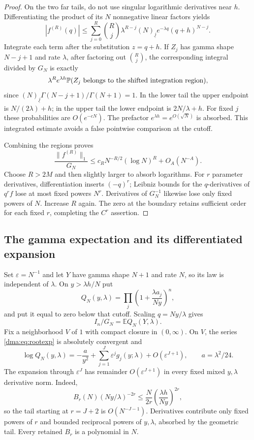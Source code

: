 \documentclass[11pt,letterpaper]{article}
\theoremstyle{remark}\newtheorem{remark}[theorem]{Remark}
\newcommand{\E}{\mathbb E}
\newcommand{\Prob}{\mathbb P}
\newcommand{\fall}[2]{(#1)_{\underline{#2}}}
\begin{document}
\begin{proof}
On the two far tails, do not use singular logarithmic derivatives near $h$. Differentiating the product of its $N$ nonnegative linear factors yields
\begin{equation}\label{dma:eq:leibniz}
 |f^{(R)}(q)|\leq\sum_{j=0}^R\binom Rj\lambda^{R-j}
 \fall Nj e^{-\lambda q}(q+h)^{N-j}.
\end{equation}
Integrate each term after the substitution $z=q+h$. If $Z_j$ has gamma shape $N-j+1$ and rate $\lambda$, after factoring out $\binom Rj$, the corresponding integral divided by $G_N$ is exactly
\begin{equation}\label{dma:eq:tailintegrated}
 \lambda^R e^{\lambda h}\Prob(Z_j\hbox{ belongs to the shifted integration region}),
\end{equation}
since $\fall Nj\Gamma(N-j+1)/\Gamma(N+1)=1$. In the lower tail the upper endpoint is $N/(2\lambda)+h$; in the upper tail the lower endpoint is $2N/\lambda+h$. For fixed $j$ these probabilities are $O(e^{-cN})$. The prefactor $e^{\lambda h}=e^{O(\sqrt N)}$ is absorbed. This integrated estimate avoids a false pointwise comparison at the cutoff.

Combining the regions proves
\[
 \frac{\|f^{(R)}\|_1}{G_N}
 \leq c_R N^{-R/2}(\log N)^R+O_A(N^{-A}).
\]
Choose $R>2M$ and then slightly larger to absorb logarithms. For $r$ parameter derivatives, differentiation inserts $(-q)^r$; Leibniz bounds for the $q$-derivatives of $q^rf$ lose at most fixed powers $N^r$. Derivatives of $G_N^{-1}$ likewise lose only fixed powers of $N$. Increase $R$ again. The zero at the boundary retains sufficient order for each fixed $r$, completing the $C^r$ assertion.
\end{proof}

\subsection{The gamma expectation and its differentiated expansion}
Set $\varepsilon=N^{-1}$ and let $Y$ have gamma shape $N+1$ and rate $N$, so its law is independent of $\lambda$. On $y>\lambda h/N$ put
\[
 Q_N(y,\lambda)=\prod_j\left(1+\frac{\lambda a_j}{Ny}\right)^n,
\]
and put it equal to zero below that cutoff. Scaling $q=Ny/\lambda$ gives
\begin{equation}\label{dma:eq:expect}
 I_n/G_N=\E Q_N(Y,\lambda).
\end{equation}
Fix a neighborhood $V$ of $1$ with compact closure in $(0,\infty)$. On $V$, the series \eqref{dma:eq:rootexp} is absolutely convergent and
\begin{equation}\label{dma:eq:g}
 \log Q_N(y,\lambda)=-\frac a{y^2}+\sum_{j=1}^J\varepsilon^j g_j(y;\lambda)+O(\varepsilon^{J+1}),
 \qquad a=\lambda^2/24.
\end{equation}
The expansion through $\varepsilon^J$ has remainder $O(\varepsilon^{J+1})$ in every fixed mixed $y,\lambda$ derivative norm. Indeed,
\[
 B_r(N)(Ny/\lambda)^{-2r}\leq \frac N{2r}
 \left(\frac{\lambda h}{Ny}\right)^{2r},
\]
so the tail starting at $r=J+2$ is $O(N^{-J-1})$. Derivatives contribute only fixed powers of $r$ and bounded reciprocal powers of $y,\lambda$, absorbed by the geometric tail. Every retained $B_r$ is a polynomial in $N$.
\end{document}
